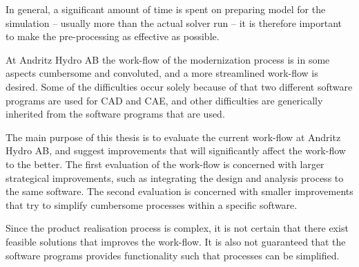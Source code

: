 In general, a significant amount of time is spent on preparing model for the simulation -- usually more than the actual solver run -- it is therefore important to make the pre-processing as effective as possible.

At Andritz Hydro AB the work-flow of the modernization process is in some aspects cumbersome and convoluted, and a more streamlined work-flow is desired. Some of the difficulties occur solely because of that two different software programs are used for CAD and CAE, and other difficulties are generically inherited from the software programs that are used. 

The main purpose of this thesis is to evaluate the current work-flow at Andritz Hydro AB, and suggest improvements that will significantly affect the work-flow to the better. The first evaluation of the work-flow is concerned with larger strategical improvements, such as integrating the design and analysis process to the same software. The second evaluation is concerned with smaller improvements that try to simplify cumbersome processes within a specific software.

Since the product realisation process is complex, it is not certain that there exist feasible solutions that improves the work-flow. It is also not guaranteed that the software programs provides functionality such that processes can be simplified.


